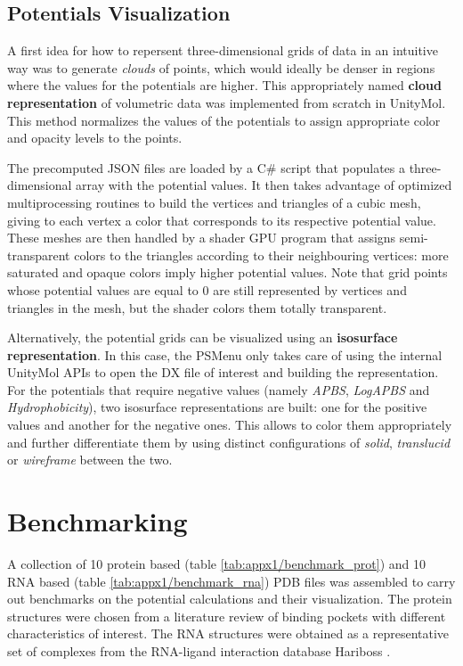   \subsection{Potentials Visualization}
    A first idea for how to repersent three-dimensional grids of data in an intuitive way was to generate \textit{clouds} of points, which would ideally be denser in regions where the values for the potentials are higher. This appropriately named \textbf{cloud representation} of volumetric data was implemented from scratch in UnityMol. This method normalizes the values of the potentials to assign appropriate color and opacity levels to the points.

    The precomputed JSON files are loaded by a C\# script that populates a three-dimensional array with the potential values. It then takes advantage of optimized multiprocessing routines to build the vertices and triangles of a cubic mesh, giving to each vertex a color that corresponds to its respective potential value. These meshes are then handled by a shader GPU program that assigns semi-transparent colors to the triangles according to their neighbouring vertices: more saturated and opaque colors imply higher potential values. Note that grid points whose potential values are equal to 0 are still represented by vertices and triangles in the mesh, but the shader colors them totally transparent.

    Alternatively, the potential grids can be visualized using an \textbf{isosurface representation}. In this case, the PSMenu only takes care of using the internal UnityMol APIs to open the DX file of interest and building the representation. For the potentials that require negative values (namely \textit{APBS}, \textit{LogAPBS} and \textit{Hydrophobicity}), two isosurface representations are built: one for the positive values and another for the negative ones. This allows to color them appropriately and further differentiate them by using distinct configurations of \textit{solid}, \textit{translucid} or \textit{wireframe} between the two.


\section{Benchmarking}
  A collection of 10 protein based (table \ref{tab:appx1/benchmark_prot}) and 10 RNA based (table \ref{tab:appx1/benchmark_rna}) PDB files was assembled to carry out benchmarks on the potential calculations and their visualization. The protein structures were chosen from a literature review of binding pockets with different characteristics of interest. The RNA structures were obtained as a representative set of complexes from the RNA-ligand interaction database Hariboss \cite{hariboss_2022}.

